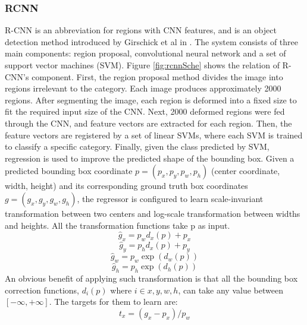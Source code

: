 \subsubsection{RCNN}
R-CNN is an abbreviation for regions with CNN features, and is an object detection method introduced by Girschick et al in \cite{DBLP:journals/corr/GirshickDDM13}. The system consists of three main components: region proposal, convolutional neural network and a set of support vector machines (SVM).
Figure \ref{fig:rcnnSche} shows the relation of R-CNN's component. First, the region proposal method divides the image into regions irrelevant to the category. Each image produces approximately 2000 regions. After segmenting the image, each region is deformed into a fixed size to fit the required input size of the CNN. Next, 2000 deformed regions were fed through the CNN, and feature vectors are extracted for each region. Then, the feature vectors are registered by a set of linear SVMs, where each SVM is trained to classify a specific category. Finally, given the class predicted by SVM, regression is used to improve the predicted shape of the bounding box. Given a predicted bounding box coordinate \(p=(p_x,p_y,p_w,p_h)\) (center coordinate, width, height) and its corresponding ground truth box coordinates \(g=(g_x,g_y,g_w,g_h )\), the regressor is configured to learn scale-invariant transformation between two centers and log-scale transformation between widths and heights. All the transformation functions take p as input.
\begin{equation}
	\hat g_x=p_w d_x (p)+p_x
\end{equation}
\begin{equation}
	\hat g_y=p_h d_x (p)+p_y
\end{equation}
\begin{equation}
	\hat g_w=p_w \exp{(d_w(p))}
\end{equation}
\begin{equation}
	\hat g_h=p_h \exp{(d_h(p))}
\end{equation}
An obvious benefit of applying such transformation is that all the bounding box correction functions, \(d_i (p)\) where \( i\in {x,y,w,h}\), can take any value between \([-\infty,+\infty]\). The targets for them to learn are:
\begin{equation}
	t_x=(g_x-p_x )/p_w
\end{equation}
